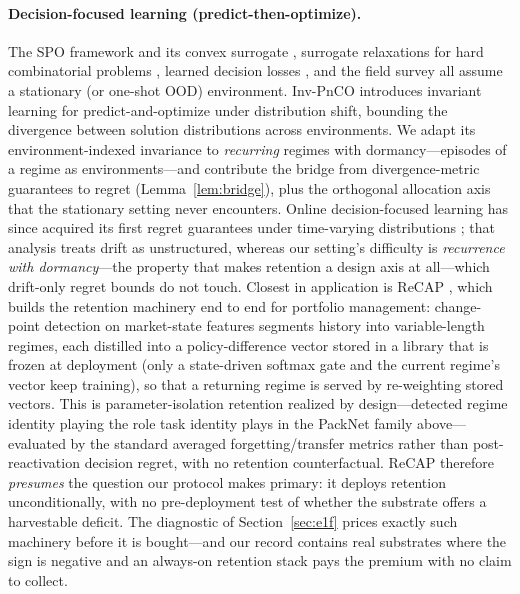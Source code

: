 \documentclass{article}
\begin{document}
\paragraph{Decision-focused learning (predict-then-optimize).} The SPO
framework and its convex surrogate \citep{elmachtoub2022smart}, surrogate
relaxations for hard combinatorial problems \citep{mandi2020smart}, learned
decision losses \citep{shah2022lodl}, and the field survey
\citep{mandi2024decision} all assume a stationary (or one-shot OOD)
environment. Inv-PnCO \citep{yan2026invpnco} introduces invariant learning
for predict-and-optimize under distribution shift, bounding the divergence
between solution distributions across environments. We adapt its
environment-indexed invariance to \emph{recurring} regimes with
dormancy---episodes of a regime as environments---and contribute the
bridge from divergence-metric guarantees to regret
(Lemma~\ref{lem:bridge}), plus the orthogonal allocation axis that the
stationary setting never encounters. Online decision-focused learning
has since acquired its first regret guarantees under time-varying
distributions \citep{capitaine2026online}; that analysis treats drift
as unstructured, whereas our setting's difficulty is \emph{recurrence
with dormancy}---the property that makes retention a design axis at
all---which drift-only regret bounds do not touch.
Closest in application is ReCAP \citep{pan2026recap}, which builds the
retention machinery end to end for portfolio management: change-point
detection on market-state features segments history into variable-length
regimes, each distilled into a policy-difference vector stored in a
library that is frozen at deployment (only a state-driven softmax gate
and the current regime's vector keep training), so that a returning
regime is served by re-weighting stored vectors. This is
parameter-isolation retention realized by design---detected regime
identity playing the role task identity plays in the PackNet family
above---evaluated by the standard averaged forgetting/transfer metrics
rather than post-reactivation decision regret, with no retention
counterfactual. ReCAP therefore \emph{presumes} the question our
protocol makes primary: it deploys retention unconditionally, with no
pre-deployment test of whether the substrate offers a harvestable
deficit. The diagnostic of Section~\ref{sec:e1f} prices exactly such
machinery before it is bought---and our record contains real substrates
where the sign is negative and an always-on retention stack pays the
premium with no claim to collect.
\end{document}
